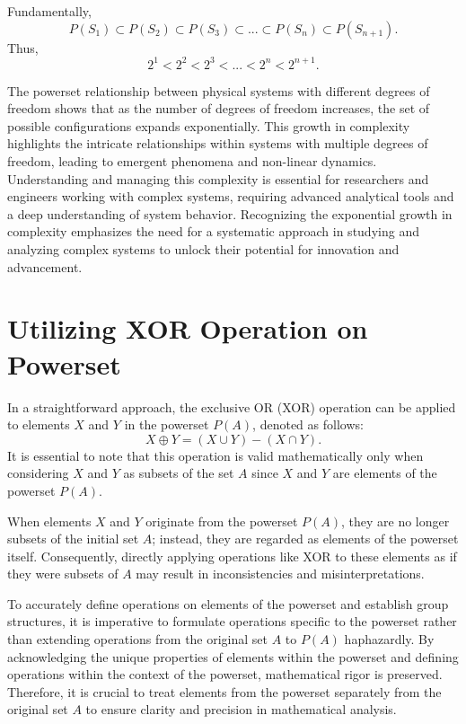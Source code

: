 \documentclass{article}
\begin{document}
Fundamentally,
$$
P(S_{1}) \subset P(S_{2}) \subset P(S_{3}) \subset ... \subset P(S_{n}) \subset P(S_{n+1}) .
$$
Thus, 
$$
2^1 <  2^2  < 2^3 < ... < 2^n < 2^{n+1}.
$$

The powerset relationship between physical systems with different degrees of freedom shows that as the number of degrees of freedom increases, the set of possible configurations expands exponentially. This growth in complexity highlights the intricate relationships within systems with multiple degrees of freedom, leading to emergent phenomena and non-linear dynamics. Understanding and managing this complexity is essential for researchers and engineers working with complex systems, requiring advanced analytical tools and a deep understanding of system behavior. Recognizing the exponential growth in complexity emphasizes the need for a systematic approach in studying and analyzing complex systems to unlock their potential for innovation and advancement.


\section{Utilizing XOR Operation on Powerset}\label{grouppn}

In a straightforward approach, the exclusive OR (XOR) operation can be applied to elements $X$ and $Y$ in the powerset $P(A)$, denoted as follows:
$$
X \oplus Y = (X \cup Y) - (X \cap Y).
$$
It is essential to note that this operation is valid mathematically only when considering $X$ and $Y$ as subsets of the 
set $A$ since $X$ and $Y$ are elements of the powerset $P(A)$.

When elements $X$ and $Y$ originate from the powerset $P(A)$, they are no longer subsets of the initial set $A$; instead, they are regarded as elements of the powerset itself. Consequently, directly applying operations like XOR to these elements as if they were subsets of $A$ may result in inconsistencies and misinterpretations.

To accurately define operations on elements of the powerset and establish group structures, it is imperative to formulate operations specific to the powerset rather than extending operations from the original set $A$ to $P(A)$ haphazardly. By acknowledging the unique properties of elements within the powerset and defining operations within the context of the powerset, mathematical rigor is preserved. Therefore, it is crucial to treat elements from the powerset separately from the original set $A$ to ensure clarity and precision in mathematical analysis.
\end{document}

